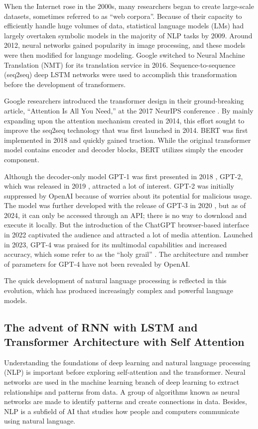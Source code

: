 When the Internet rose in the 2000s, many researchers began to create large-scale datasets, sometimes referred to as ``web corpora''. Because of their capacity to efficiently handle huge volumes of data, statistical language models (LMs) had largely overtaken symbolic models in the majority of NLP tasks by 2009. Around 2012, neural networks gained popularity in image processing, and these models were then modified for language modeling. Google switched to Neural Machine Translation (NMT) for its translation service in 2016. Sequence-to-sequence (seq2seq) deep LSTM networks were used to accomplish this transformation before the development of transformers.

Google researchers introduced the transformer design in their ground-breaking article, ``Attention Is All You Need,'' at the 2017 NeurIPS conference \cite{Vaswani2017}. By mainly expanding upon the attention mechanism created in 2014, this effort sought to improve the seq2seq technology that was first launched in 2014. BERT was first implemented in 2018 \cite{devlin2019bert} and quickly gained traction. While the original transformer model contains encoder and decoder blocks, BERT utilizes simply the encoder component.

Although the decoder-only model GPT-1 was first presented in 2018 \cite{radford2019}, GPT-2, which was released in 2019 \cite{radford2019}, attracted a lot of interest. GPT-2 was initially suppressed by OpenAI because of worries about its potential for malicious usage. The model was further developed with the release of GPT-3 in 2020 \cite{brown2020language}, but as of 2024, it can only be accessed through an API; there is no way to download and execute it locally. But the introduction of the ChatGPT browser-based interface in 2022 captivated the audience and attracted a lot of media attention. Launched in 2023, GPT-4 was praised for its multimodal capabilities and increased accuracy, which some refer to as the ``holy grail'' \cite{openai2023}. The architecture and number of parameters for GPT-4 have not been revealed by OpenAI.

The quick development of natural language processing is reflected in this evolution, which has produced increasingly complex and powerful language models.


\subsection{The advent of RNN with LSTM and Transformer Architecture with Self Attention} 
Understanding the foundations of deep learning and natural language processing (NLP) is important before exploring self-attention and the transformer. Neural networks are used in the machine learning branch of deep learning to extract relationships and patterns from data. A group of algorithms known as neural networks are made to identify patterns and create connections in data. Besides, NLP is a subfield of AI that studies how people and computers communicate using natural language.

